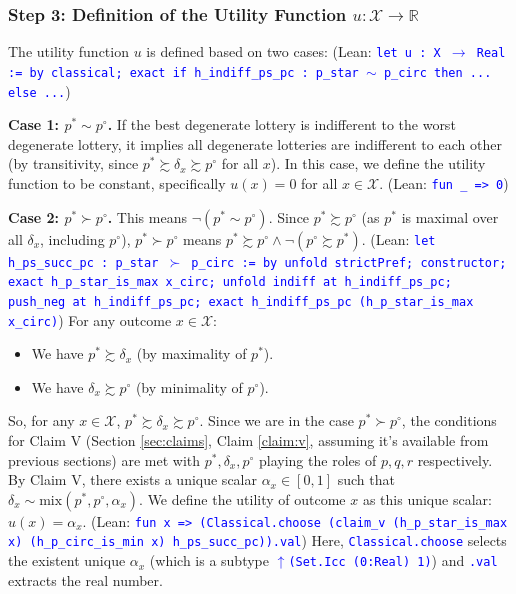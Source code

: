 \documentclass{article}
\theoremstyle{definition}
\newcommand{\R}{\mathbb{R}}
\newcommand{\X}{\mathcal{X}}
\newcommand{\tactic}[1]{\textcolor{blue}{\texttt{#1}}}
\newcommand{\pref}{\succsim} %
\newcommand{\strictpref}{\succ} %
\newcommand{\indiff}{\sim} %
\newcommand{\mix}{\mathrm{mix}} %
\begin{document}
\subsubsection{Step 3: Definition of the Utility Function $u: \X \to \R$}
The utility function $u$ is defined based on two cases:
(Lean: \tactic{let u : X $\rightarrow$ Real := by classical; exact if h\_indiff\_ps\_pc : p\_star $\sim$ p\_circ then ... else ...})

\textbf{Case 1: $p^* \indiff p^\circ$.}
If the best degenerate lottery is indifferent to the worst degenerate lottery, it implies all degenerate lotteries are indifferent to each other (by transitivity, since $p^* \pref \delta_x \pref p^\circ$ for all $x$). In this case, we define the utility function to be constant, specifically $u(x) = 0$ for all $x \in \X$.
(Lean: \tactic{fun \_ => 0})

\textbf{Case 2: $p^* \strictpref p^\circ$.}
This means $\lnot(p^* \indiff p^\circ)$. Since $p^* \pref p^\circ$ (as $p^*$ is maximal over all $\delta_x$, including $p^\circ$), $p^* \strictpref p^\circ$ means $p^* \pref p^\circ \land \lnot(p^\circ \pref p^*)$.
(Lean: \tactic{let h\_ps\_succ\_pc : p\_star $\succ$ p\_circ := by unfold strictPref; constructor; exact h\_p\_star\_is\_max x\_circ; unfold indiff at h\_indiff\_ps\_pc; push\_neg at h\_indiff\_ps\_pc; exact h\_indiff\_ps\_pc (h\_p\_star\_is\_max x\_circ)})
For any outcome $x \in \X$:
\begin{itemize}
    \item We have $p^* \pref \delta_x$ (by maximality of $p^*$).
    \item We have $\delta_x \pref p^\circ$ (by minimality of $p^\circ$).
\end{itemize}
So, for any $x \in \X$, $p^* \pref \delta_x \pref p^\circ$.
Since we are in the case $p^* \strictpref p^\circ$, the conditions for Claim V (Section \ref{sec:claims}, Claim \ref{claim:v}, assuming it's available from previous sections) are met with $p^*, \delta_x, p^\circ$ playing the roles of $p,q,r$ respectively.
By Claim V, there exists a unique scalar $\alpha_x \in [0, 1]$ such that $\delta_x \indiff \mix(p^*, p^\circ, \alpha_x)$.
We define the utility of outcome $x$ as this unique scalar: $u(x) = \alpha_x$.
(Lean: \tactic{fun x => (Classical.choose (claim\_v (h\_p\_star\_is\_max x) (h\_p\_circ\_is\_min x) h\_ps\_succ\_pc)).val})
Here, \tactic{Classical.choose} selects the existent unique $\alpha_x$ (which is a subtype \tactic{$\uparrow$(Set.Icc (0:Real) 1)}) and \tactic{.val} extracts the real number.
\end{document}
